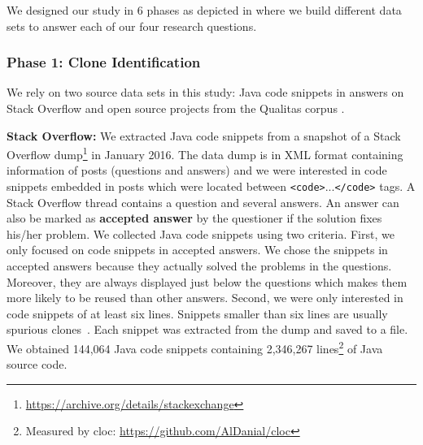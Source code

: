 \documentclass[sigconf,review, anonymous]{acmart}
\begin{document}
We designed our study in 6 phases as depicted in  where
we build different data sets to answer each of our four research
questions. 

\subsubsection{Phase 1: Clone Identification}

We rely on two source data sets in this study: Java code snippets in answers
on Stack Overflow and open source projects from the Qualitas corpus
\cite{QualitasCorpus}.

\textbf{Stack Overflow:} 
We extracted Java code snippets from a snapshot of a Stack Overflow
dump\footnote{\url{https://archive.org/details/stackexchange}} in
January 2016. 
The data
dump is in XML format containing information of posts
(questions and answers) and 
we were interested in code snippets embedded
in posts which were located between
{\small\texttt{<code>}...\texttt{</code>}} tags. A Stack Overflow
thread contains a question and several answers. An answer can also be
marked as \textbf{accepted answer} by the questioner if the solution
fixes his/her problem. We collected Java code snippets using two
criteria. First, we only focused on code snippets in accepted
answers. We chose the snippets in accepted answers because they
actually solved the problems in the questions. Moreover, they are
always displayed just below the questions which makes them more
likely to be reused than other answers. Second, we were only
interested in code snippets of at least six lines. Snippets smaller
than six lines are usually spurious clones~\cite{Bellon2007}. Each
snippet was extracted from the dump and saved to a file.
We obtained 144,064 Java code snippets containing 2,346,267
lines\footnote{Measured by cloc:
  \url{https://github.com/AlDanial/cloc}} of Java source code.
\end{document}
